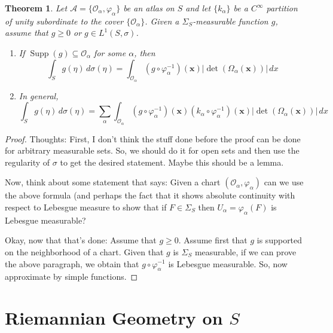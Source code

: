 \documentclass[11pt]{article}
\theoremstyle{theorem}
\newtheorem{theorem}{Theorem}[section]
\newcommand\supp{\operatorname{Supp}}
\renewcommand\det{\operatorname{det}}
\begin{document}
\begin{theorem}
Let $\mathcal{A}=\{\mathcal{O}_\alpha,\varphi_\alpha\}$ be an atlas on $S$ and let $\{k_\alpha\}$ be a $C^\infty$ partition of unity subordinate to the cover $\{\mathcal{O}_\alpha\}$. Given a $\Sigma_S$-measurable function $g$, assume that $g\geq 0$ or $g\in L^1(S,\sigma)$.
\begin{enumerate}
\item If $\supp(g)\subseteq \mathcal{O}_\alpha$ for some $\alpha$, then
\begin{equation*}
\int_S g(\eta)\,d\sigma(\eta)=\int_{\mathcal{O}_\alpha}(g\circ\varphi_{\alpha}^{-1})(\mathbf{x})|\det(\Omega_\alpha(\mathbf{x}))|\,dx
\end{equation*}
\item In general,
\begin{equation*}
\int_S g(\eta)\,d\sigma(\eta)=\sum_{\alpha}\int_{\mathcal{O}_\alpha}(g\circ \varphi_\alpha^{-1})(\mathbf{x})(k_\alpha\circ\varphi_{\alpha}^{-1})(\mathbf{x})|\det(\Omega_\alpha(\mathbf{x}))|\,dx
\end{equation*}
\end{enumerate}
\end{theorem}
\begin{proof}
Thoughts: First, I don't think the stuff done before the proof can be done for arbitrary measurable sets. So, we should do it for open sets and then use the regularity of $\sigma$ to get the desired statement. Maybe this should be a lemma. 

Now, think about some statement that says: Given a chart $(\mathcal{O}_\alpha,\varphi_\alpha)$ can we use the above formula (and perhaps the fact that it shows absolute continuity with respect to Lebesgue measure to show that if $F\in \Sigma_S$ then $U_\alpha=\varphi_{\alpha}(F)$ is Lebesgue measurable?

Okay, now that that's done: Assume that $g\geq 0$. Assume first that $g$ is supported on the neighborhood of a chart. Given that $g$ is $\Sigma_S$ measurable, if we can prove the above paragraph, we obtain that $g\circ\varphi^{-1}_\alpha$ is Lebesgue measurable. So, now approximate by simple functions.
\end{proof}









\section{Riemannian Geometry on $S$}
\end{document}
